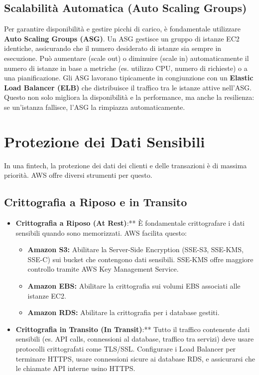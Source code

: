 \documentclass[a4paper,12pt]{report}
\begin{document}
\subsection{Scalabilità Automatica (Auto Scaling Groups)}
\label{subsec:auto-scaling}
Per garantire disponibilità e gestire picchi di carico, è fondamentale utilizzare \textbf{Auto Scaling Groups (ASG)}. Un ASG gestisce un gruppo di istanze EC2 identiche, assicurando che il numero desiderato di istanze sia sempre in esecuzione. Può aumentare (scale out) o diminuire (scale in) automaticamente il numero di istanze in base a metriche (es. utilizzo CPU, numero di richieste) o a una pianificazione. Gli ASG lavorano tipicamente in congiunzione con un \textbf{Elastic Load Balancer (ELB)} che distribuisce il traffico tra le istanze attive nell'ASG. Questo non solo migliora la disponibilità e la performance, ma anche la resilienza: se un'istanza fallisce, l'ASG la rimpiazza automaticamente.

\section{Protezione dei Dati Sensibili}
\label{sec:data-protection}
In una fintech, la protezione dei dati dei clienti e delle transazioni è di massima priorità. AWS offre diversi strumenti per questo.

\subsection{Crittografia a Riposo e in Transito}
\label{subsec:encryption}
\begin{itemize}
    \item \textbf{Crittografia a Riposo (At Rest)}:** È fondamentale crittografare i dati sensibili quando sono memorizzati. AWS facilita questo:
        \begin{itemize}
            \item \textbf{Amazon S3:} Abilitare la Server-Side Encryption (SSE-S3, SSE-KMS, SSE-C) sui bucket che contengono dati sensibili. SSE-KMS offre maggiore controllo tramite AWS Key Management Service.
            \item \textbf{Amazon EBS:} Abilitare la crittografia sui volumi EBS associati alle istanze EC2.
            \item \textbf{Amazon RDS:} Abilitare la crittografia per i database gestiti.
        \end{itemize}
    \item \textbf{Crittografia in Transito (In Transit)}:** Tutto il traffico contenente dati sensibili (es. API calls, connessioni al database, traffico tra servizi) deve usare protocolli crittografati come TLS/SSL. Configurare i Load Balancer per terminare HTTPS, usare connessioni sicure ai database RDS, e assicurarsi che le chiamate API interne usino HTTPS.
\end{itemize}
\end{document}
